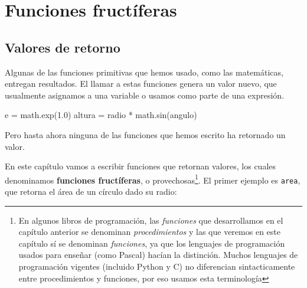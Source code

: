 


\chapter{Funciones fructíferas}
\label{funcReturn}

\section{Valores de retorno}

Algunas de las funciones primitivas que hemos usado, como las matemáticas,
entregan resultados. El llamar a estas funciones genera un valor nuevo, que
usualmente asignamos a una variable o usamos como parte de una expresión.

\beforeverb
\begin{pythoncode}
e = math.exp(1.0)
altura = radio * math.sin(angulo)
\end{pythoncode}
\afterverb
%

Pero hasta ahora ninguna de las funciones que hemos escrito ha retornado
un valor.

En este capítulo vamos a escribir funciones que retornan valores, los
cuales denominamos {\bf funciones fructíferas}, o provechosas\footnote{En 
algunos libros de programación, las \textit{funciones} que desarrollamos en el 
capítulo anterior se denominan \textit{procedimientos} y las que veremos en 
este capítulo sí se denominan \textit{funciones}, ya que los lenguajes de 
programación usados para enseñar (como Pascal) hacían la distinción. Muchos 
lenguajes de programación vigentes (incluido Python y C) no diferencian
sintacticamente entre procedimientos y funciones, por eso usamos esta 
terminología}. El primer ejemplo es \texttt{area}, que retorna el área
de un círculo dado su radio:

